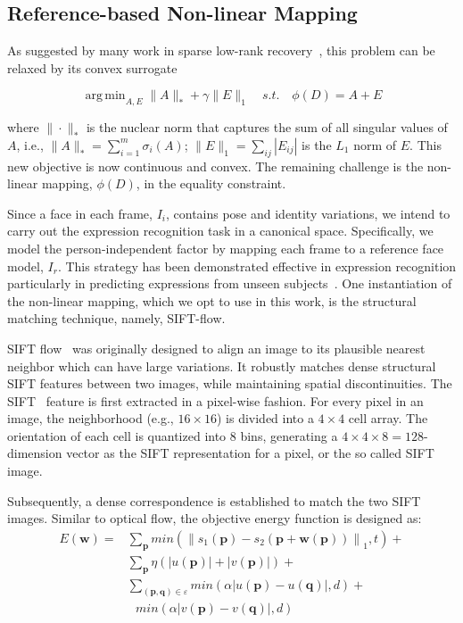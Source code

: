\documentclass[journal]{IEEEtran}
\DeclareMathOperator*{\argmin}{arg\,min}
\begin{document}
\subsection{Reference-based Non-linear Mapping} 
As suggested by many work in sparse low-rank recovery~\cite{Candes11,Lin09,Peng_CVPR10}, this problem can be relaxed by its convex surrogate

\begin{equation} \label{eq:rpca}
\argmin_{A,E} \|A\|_*+\gamma \|E\|_1  \quad s.t. \quad \phi (D) = A + E 
\end{equation}

\noindent where $\|\cdot\|_*$ is the nuclear norm that captures the sum of all singular values of $A$, i.e., $\|A\|_*=\sum^m_{i=1}\sigma_i(A)$; $\|E\|_1=\sum_{ij}|E_{ij}|$ is the $L_1$ norm of $E$. This new objective is now continuous and convex. The remaining challenge is the non-linear mapping, $\phi (D)$, in the equality constraint. 

Since a face in each frame, $I_i$, contains pose and identity variations, we intend to carry out the expression recognition task in a canonical space. Specifically, we model the person-independent factor by mapping each frame to a reference face model, $I_r$. This strategy has been demonstrated effective in expression recognition particularly in predicting expressions from unseen subjects~\cite{Yang_SMCB12,Dahmane_TMM14}. One instantiation of the non-linear mapping, which we opt to use in this work, is the structural matching technique, namely, SIFT-flow. 

SIFT flow~\cite{Liu_PAMI11} was originally designed to align an image to its plausible nearest neighbor which can have large variations. It robustly matches dense structural SIFT features between two images, while maintaining spatial discontinuities. The SIFT~\cite{Lowe_ICCV99} feature is first extracted in a pixel-wise fashion. For every pixel in an image, the neighborhood (e.g., $16\times16$) is divided into a $4\times4$ cell array. The orientation of each cell is quantized into 8 bins, generating a $4\times4\times8=128$-dimension vector as the SIFT representation for a pixel, or the so called SIFT image.

Subsequently, a dense correspondence is established to match the two SIFT images. Similar to optical flow, the objective energy function is designed as:
\begin{align}
	\label{data_term}
	E(\textbf{w})=&\sum_\textbf{p} min(\left\|s_1 (\textbf{p})-s_2 (\textbf{p}+\textbf{w}(\textbf{p}))\right\|_1 ,t)+
\\\label{small_constraint}
&\sum_\textbf{p} \eta(\left|u(\textbf{p})\right|+\left|v(\textbf{p})\right|) +
\\\nonumber
&\sum_{(\textbf{p},\textbf{q})\in\varepsilon} min(\alpha\left|u(\textbf{p})-u(\textbf{q})\right|,d)+
\\\label{smooth_constraint}
&~~~min(\alpha\left|v(\textbf{p})-v(\textbf{q})\right|,d)
\end{align}
\end{document}
